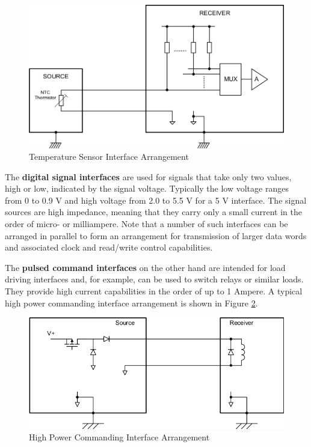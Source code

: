 \begin{figure}[h]
\centering\includegraphics[scale=0.3]{fig/temperature_sensor_interface_arrangement}
\caption{Temperature Sensor Interface Arrangement}
\label{fig:Temperature Sensor Interface Arrangement}
\end{figure}

The \textbf{digital signal interfaces} are used for signals that take only two values, high or low, indicated by the signal voltage. Typically the low voltage ranges from 0 to 0.9 V and high voltage from 2.0 to 5.5 V for a 5 V interface. The signal sources are high impedance, meaning that they carry only a small current in the order of micro- or milliampere. Note that a number of such interfaces can be arranged in parallel to form an arrangement for transmission of larger data words and associated clock and read/write control capabilities.

The \textbf{pulsed command interfaces} on the other hand are intended for load driving interfaces and, for example, can be used to switch relays or similar loads. They provide high current capabilities in the order of up to 1 Ampere. A typical high power commanding interface arrangement is shown in Figure \ref{fig:High Power Commanding Interface Arrangement}.

\begin{figure}[h]
\centering\includegraphics[scale=0.3]{fig/high_power_commanding_interface_arrangement}
\caption{High Power Commanding Interface Arrangement}
\label{fig:High Power Commanding Interface Arrangement}
\end{figure}
 
